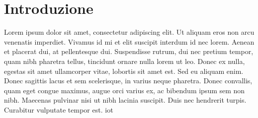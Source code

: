 \chapter{Introduzione}
Lorem ipsum dolor sit amet, consectetur adipiscing elit. Ut aliquam eros non arcu venenatis imperdiet. Vivamus id mi et elit suscipit interdum id nec lorem. Aenean et placerat dui, at pellentesque dui. Suspendisse rutrum, dui nec pretium tempor, quam nibh pharetra tellus, tincidunt ornare nulla lorem ut leo. Donec ex nulla, egestas sit amet ullamcorper vitae, lobortis sit amet est. Sed eu aliquam enim. Donec sagittis lacus et sem scelerisque, in varius neque pharetra. Donec convallis, quam eget congue maximus, augue orci varius ex, ac bibendum ipsum sem non nibh. Maecenas pulvinar nisi ut nibh lacinia suscipit. Duis nec hendrerit turpis. Curabitur vulputate tempor est. \cite{11130041} \gls{iot}